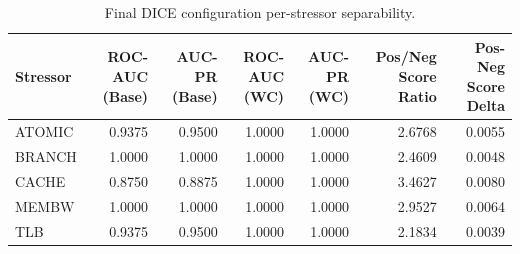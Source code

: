 \begin{table}[t]
\centering
\caption{Final DICE configuration per-stressor separability.}
\label{tab:dice_full_stressor}
\footnotesize
\begin{tabular}{lrrrrrr}
\toprule
Stressor & ROC-AUC (Base) & AUC-PR (Base) & ROC-AUC (WC) & AUC-PR (WC) & Pos/Neg Score Ratio & Pos-Neg Score Delta \\
\midrule
ATOMIC & 0.9375 & 0.9500 & 1.0000 & 1.0000 & 2.6768 & 0.0055 \\
BRANCH & 1.0000 & 1.0000 & 1.0000 & 1.0000 & 2.4609 & 0.0048 \\
CACHE & 0.8750 & 0.8875 & 1.0000 & 1.0000 & 3.4627 & 0.0080 \\
MEMBW & 1.0000 & 1.0000 & 1.0000 & 1.0000 & 2.9527 & 0.0064 \\
TLB & 0.9375 & 0.9500 & 1.0000 & 1.0000 & 2.1834 & 0.0039 \\
\bottomrule
\end{tabular}

\end{table}

